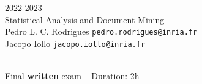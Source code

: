 \begin{flushleft}
 \hfill {} 2022-2023 \\
Statistical Analysis and Document Mining \\
Pedro L. C. Rodrigues   \hfill  \texttt{pedro.rodrigues@inria.fr} \\
Jacopo Iollo \hfill \texttt{jacopo.iollo@inria.fr} \\

\HRuleTop\\
\begin{center}
\Large{Final \textbf{written} exam -- Duration: 2h}
\end{center}
\HRuleBottom
\end{flushleft}
